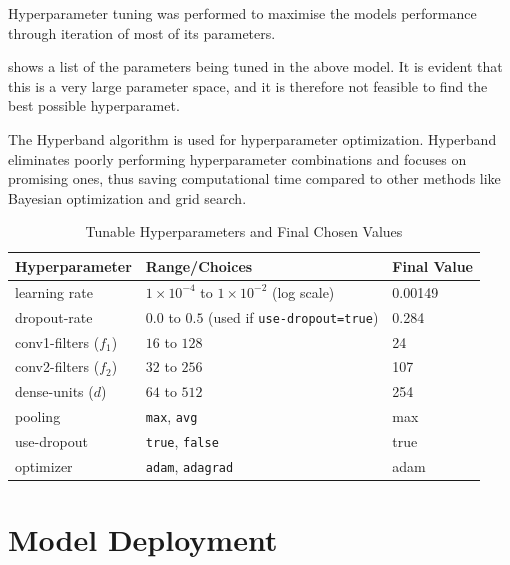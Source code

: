 Hyperparameter tuning was performed to maximise the models performance through iteration of most of its parameters. 

 shows a list of the parameters being tuned in the above model. It is evident that this is a very large parameter space, and it is therefore not feasible to find the best possible hyperparamet.

\begin{figure}[p]

\end{figure}


The Hyperband algorithm is used for hyperparameter optimization. Hyperband eliminates poorly performing hyperparameter combinations and focuses on promising ones, thus saving computational time compared to other methods like Bayesian optimization and grid search. 

\begin{table}[h]
\centering
\caption{Tunable Hyperparameters and Final Chosen Values}
\begin{tabular}{lll}
\toprule
\textbf{Hyperparameter} & \textbf{Range/Choices} & \textbf{Final Value} \\
\midrule
learning rate           & $1{\times}10^{-4}$ to $1{\times}10^{-2}$ (log scale) & 0.00149 \\
dropout-rate            & $0.0$ to $0.5$ (used if \texttt{use-dropout=true}) & 0.284 \\
conv1-filters ($f_1$)   & $16$ to $128$ & 24 \\
conv2-filters ($f_2$)   & $32$ to $256$ & 107 \\
dense-units ($d$)       & $64$ to $512$ & 254 \\
pooling                 & \texttt{max}, \texttt{avg} & max \\
use-dropout             & \texttt{true}, \texttt{false} & true \\
optimizer               & \texttt{adam}, \texttt{adagrad} & adam \\
\bottomrule
\end{tabular}
\label{tab:tunable_hyperparameters}
\end{table}


\section{Model Deployment}



